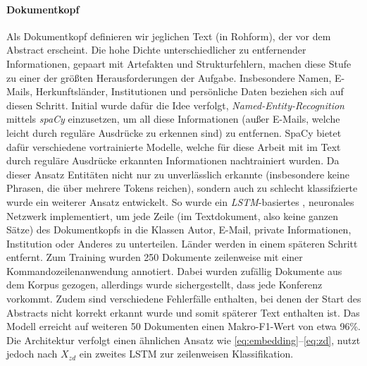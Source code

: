 \documentclass[bachelor,german]{info1thesis}
\begin{document}
\paragraph{Dokumentkopf} Als Dokumentkopf definieren wir jeglichen Text (in Rohform), der vor dem Abstract erscheint. Die hohe Dichte unterschiedlicher zu entfernender Informationen, gepaart mit Artefakten und Strukturfehlern, machen diese Stufe zu einer der größten Herausforderungen der Aufgabe. Insbesondere Namen, E-Mails, Herkunftsländer, Institutionen und persönliche Daten beziehen sich auf diesen Schritt. Initial wurde dafür die Idee verfolgt, \textit{Named-Entity-Recognition} mittels \textit{spaCy} \cite{Honnibal2017} einzusetzen, um all diese Informationen (außer E-Mails, welche leicht durch reguläre Ausdrücke zu erkennen sind) zu entfernen. SpaCy bietet dafür verschiedene vortrainierte Modelle, welche für diese Arbeit mit im Text durch reguläre Ausdrücke erkannten Informationen nachtrainiert wurden. Da dieser Ansatz Entitäten nicht nur zu unverlässlich erkannte (insbesondere keine Phrasen, die über mehrere Tokens reichen), sondern auch zu schlecht klassifzierte wurde ein weiterer Ansatz entwickelt. So wurde ein \textit{LSTM}-basiertes \cite{Hochreiter1997}, neuronales Netzwerk implementiert, um jede Zeile (im Textdokument, also keine ganzen Sätze) des Dokumentkopfs in die Klassen Autor, E-Mail, private Informationen, Institution oder Anderes zu unterteilen. Länder werden in einem späteren Schritt entfernt.  Zum Training wurden 250 Dokumente zeilenweise mit einer Kommandozeilenanwendung annotiert. Dabei wurden zufällig Dokumente aus dem Korpus gezogen, allerdings wurde sichergestellt, dass jede Konferenz vorkommt. Zudem sind verschiedene Fehlerfälle enthalten, bei denen der Start des Abstracts nicht korrekt erkannt wurde und somit späterer Text enthalten ist. Das Modell erreicht auf weiteren 50 Dokumenten einen Makro-F1-Wert von etwa 96\%. Die Architektur verfolgt einen ähnlichen Ansatz wie \autoref{eq:embedding}--\ref{eq:zd}, nutzt jedoch nach $X_{zd}$ ein zweites LSTM zur zeilenweisen Klassifikation.
\end{document}
